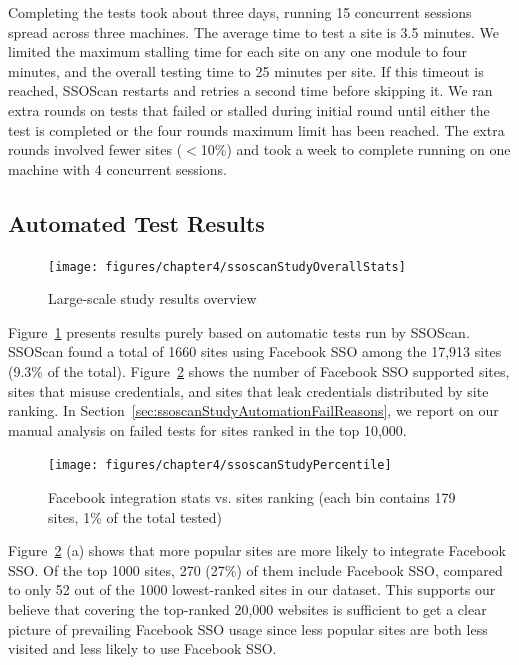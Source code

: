 Completing the tests took about three days, running 15 concurrent sessions spread across three machines.  The average time to test a site is 3.5 minutes.  We limited the maximum stalling time for each site on any one module to four minutes, and the overall testing time to 25 minutes per site.  If this timeout is reached, SSOScan restarts and retries a second time before skipping it.  We ran extra rounds on tests that failed or stalled during initial round until either the test is completed or the four rounds maximum limit has been reached.  The extra rounds involved fewer sites ($<$10\%) and took a week to complete running on one machine with 4 concurrent sessions.

\subsection{Automated Test Results}
\label{sec:ssoscanStudyGeneralstats}

\begin{figure}[hbt]
\centering
\texttt{[image: figures/chapter4/ssoscanStudyOverallStats]}
\caption{Large-scale study results overview}
\label{fig:ssoscanStudyOverallStats}
\end{figure}

Figure~\ref{fig:ssoscanStudyOverallStats} presents results purely based on automatic tests run by SSOScan.  SSOScan found a total of 1660 sites using Facebook SSO among the 17,913 sites (9.3\% of the total).  Figure~\ref{fig:ssoscanStudyPercentile} shows the number of Facebook SSO supported sites, sites that misuse credentials, and sites that leak credentials distributed by site ranking.  In Section~\ref{sec:ssoscanStudyAutomationFailReasons}, we report on our manual analysis on failed tests for sites ranked in the top 10,000.

\begin{figure}[tbh]
\centering
\texttt{[image: figures/chapter4/ssoscanStudyPercentile]}
\caption{Facebook integration stats vs. sites ranking (each bin contains 179 sites, 1\% of the total tested)}
\label{fig:ssoscanStudyPercentile}
\end{figure}

 Figure~\ref{fig:ssoscanStudyPercentile} (a) shows that more popular sites are more likely to integrate Facebook SSO.  Of the top 1000 sites, 270 (27\%) of them include Facebook SSO, compared to only 52 out of the 1000 lowest-ranked sites in our dataset.  This supports our believe that covering the top-ranked 20,000 websites is sufficient to get a clear picture of prevailing Facebook SSO usage since less popular sites are both less visited and less likely to use Facebook SSO.

